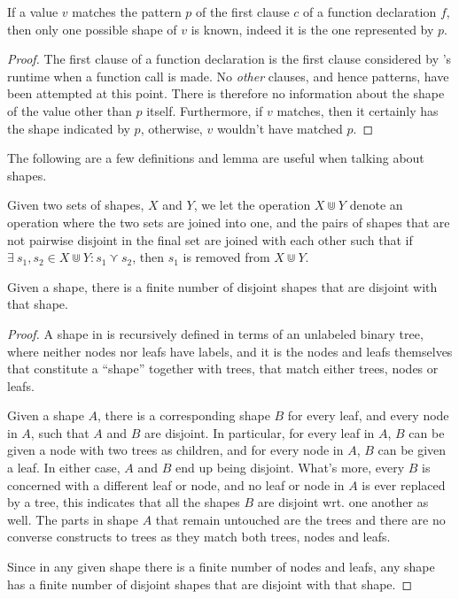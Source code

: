 \begin{lemma}\label{lemma:extend-first-clause} If a value $v$ matches the
pattern $p$ of the first clause $c$ of a function declaration $f$, then only
one possible shape of $v$ is known, indeed it is the one represented by
$p$.\end{lemma}

\begin{proof} The first clause of a function declaration is the first clause
considered by \D{}'s runtime when a function call is made. No \emph{other}
clauses, and hence patterns, have been attempted at this point. There is
therefore no information about the shape of the value other than $p$ itself.
Furthermore, if $v$ matches, then it certainly has the shape indicated by $p$,
otherwise, $v$ wouldn't have matched $p$.\end{proof}

The following are a few definitions and lemma are useful when talking about
shapes.

\begin{definition} Given two sets of shapes, $X$ and $Y$, we let the operation
$X\Cup Y$ denote an operation where the two sets are joined into one, and the
pairs of shapes that are not pairwise disjoint in the final set are joined with
each other such that if $\exists\ s_1,s_2\in X\Cup Y : s_1\curlyvee s_2$, then
$s_1$ is removed from $X\Cup Y$.  \end{definition}

\begin{lemma}\label{lemma:extend-finite-converse} Given a shape, there is a
finite number of disjoint shapes that are disjoint with that shape.\end{lemma}

\begin{proof} A shape in \D{} is recursively defined in terms of an unlabeled
binary tree, where neither nodes nor leafs have labels, and it is the nodes and
leafs themselves that constitute a ``shape'' together with trees, that match
either trees, nodes or leafs.

Given a shape $A$, there is a corresponding shape $B$ for every leaf, and every
node in $A$, such that $A$ and $B$ are disjoint. In particular, for every leaf
in $A$, $B$ can be given a node with two trees as children, and for every node
in $A$, $B$ can be given a leaf. In either case, $A$ and $B$ end up being
disjoint. What's more, every $B$ is concerned with a different leaf or node,
and no leaf or node in $A$ is ever replaced by a tree, this indicates that all
the shapes $B$ are disjoint wrt. one another as well. The parts in shape $A$
that remain untouched are the trees and there are no converse constructs to trees
as they match both trees, nodes and leafs.

Since in any given shape there is a finite number of nodes and leafs, any shape
has a finite number of disjoint shapes that are disjoint with that shape.
\end{proof}


